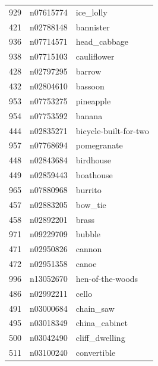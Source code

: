 \begin{table}
\begin{tabular}{cll}
929 & n07615774 & ice_lolly \\
421 & n02788148 & bannister \\
936 & n07714571 & head_cabbage \\
938 & n07715103 & cauliflower \\
428 & n02797295 & barrow \\
432 & n02804610 & bassoon \\
953 & n07753275 & pineapple \\
954 & n07753592 & banana \\
444 & n02835271 & bicycle-built-for-two \\
957 & n07768694 & pomegranate \\
448 & n02843684 & birdhouse \\
449 & n02859443 & boathouse \\
965 & n07880968 & burrito \\
457 & n02883205 & bow_tie \\
458 & n02892201 & brass \\
971 & n09229709 & bubble \\
471 & n02950826 & cannon \\
472 & n02951358 & canoe \\
996 & n13052670 & hen-of-the-woods \\
486 & n02992211 & cello \\
491 & n03000684 & chain_saw \\
495 & n03018349 & china_cabinet \\
500 & n03042490 & cliff_dwelling \\
511 & n03100240 & convertible \\
\bottomrule
\end{tabular}
\end{table}
